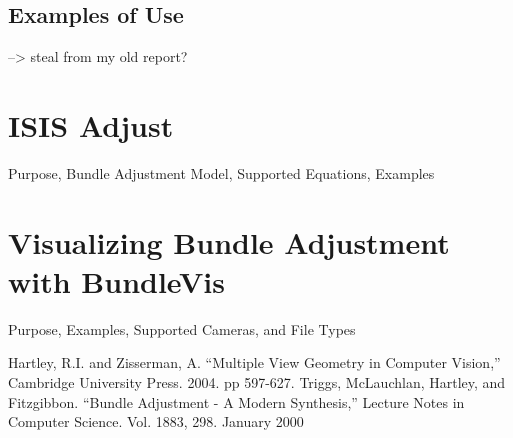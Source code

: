 \subsection{Examples of Use}

--> steal from my old report?

\section{ISIS Adjust}

Purpose, Bundle Adjustment Model, Supported Equations, Examples

\section{Visualizing Bundle Adjustment with BundleVis}

Purpose, Examples, Supported Cameras, and File Types

\begin{thebibliography}{1}

 Hartley, R.I. and Zisserman, A. ``Multiple View Geometry in Computer Vision,''
  Cambridge University Press. 2004. pp 597-627.
 Triggs, McLauchlan, Hartley, and Fitzgibbon. ``Bundle Adjustment - A Modern Synthesis,''
  Lecture Notes in Computer Science. Vol. 1883, 298. January 2000

\end{thebibliography}
